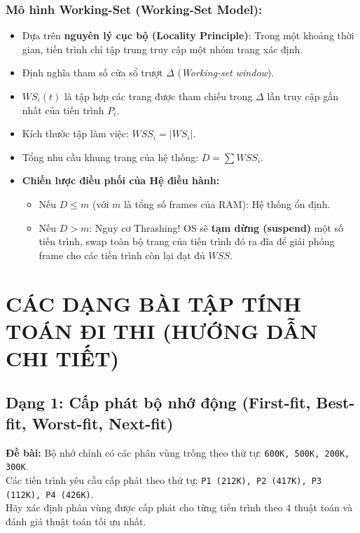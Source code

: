 \documentclass[11pt,a4paper]{article}
\begin{document}
\subsubsection*{Mô hình Working-Set (Working-Set Model):}
\begin{itemize}
    \item Dựa trên \textbf{nguyên lý cục bộ (Locality Principle)}: Trong một khoảng thời gian, tiến trình chỉ tập trung truy cập một nhóm trang xác định.
    \item Định nghĩa tham số cửa sổ trượt $\Delta$ (\textit{Working-set window}).
    \item $WS_i(t)$ là tập hợp các trang được tham chiếu trong $\Delta$ lần truy cập gần nhất của tiến trình $P_i$.
    \item Kích thước tập làm việc: $WSS_i = |WS_i|$.
    \item Tổng nhu cầu khung trang của hệ thống: $D = \sum WSS_i$.
    \item \textbf{Chiến lược điều phối của Hệ điều hành:}
    \begin{itemize}[noitemsep]
        \item Nếu $D \le m$ (với $m$ là tổng số frames của RAM): Hệ thống ổn định.
        \item Nếu $D > m$: Nguy cơ Thrashing! OS sẽ \textbf{tạm dừng (suspend)} một số tiến trình, swap toàn bộ trang của tiến trình đó ra đĩa để giải phóng frame cho các tiến trình còn lại đạt đủ $WSS$.
    \end{itemize}
\end{itemize}

\newpage
\section{CÁC DẠNG BÀI TẬP TÍNH TOÁN ĐI THI (HƯỚNG DẪN CHI TIẾT)}

\subsection{Dạng 1: Cấp phát bộ nhớ động (First-fit, Best-fit, Worst-fit, Next-fit)}
\begin{examplebox}
\textbf{Đề bài:} Bộ nhớ chính có các phân vùng trống theo thứ tự: \texttt{600K, 500K, 200K, 300K}.\\
Các tiến trình yêu cầu cấp phát theo thứ tự: \texttt{P1 (212K), P2 (417K), P3 (112K), P4 (426K)}.\\
Hãy xác định phân vùng được cấp phát cho từng tiến trình theo 4 thuật toán và đánh giá thuật toán tối ưu nhất.
\end{examplebox}
\end{document}
